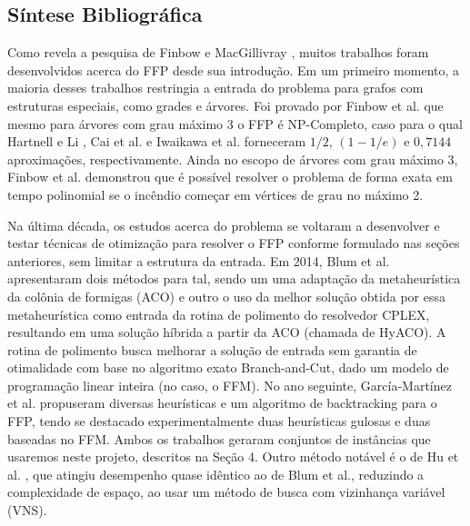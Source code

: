 \documentclass{MO824}
\begin{document}
\subsection{Síntese Bibliográfica} \label{related}

    Como revela a pesquisa de Finbow e MacGillivray \cite{survey}, muitos trabalhos foram desenvolvidos acerca do FFP desde sua introdução. Em um primeiro momento, a maioria desses trabalhos restringia a entrada do problema para grafos com estruturas especiais, como grades e árvores. Foi provado por Finbow et al. \cite{FINBOW20072094} que mesmo para árvores com grau máximo 3 o FFP é NP-Completo, caso para o qual Hartnell e Li \cite{aprox1}, Cai et al. \cite{aprox2} e Iwaikawa et al. \cite{iwaikawa} forneceram $1/2$, $(1- 1/e)$ e $0,7144$ aproximações, respectivamente. Ainda no escopo de árvores com grau máximo 3, Finbow et al. \cite{FINBOW20072094} demonstrou que é possível resolver o problema de forma exata em tempo polinomial se o incêndio começar em vértices de grau no máximo 2.
   
    Na última década, os estudos acerca do problema se voltaram a desenvolver e testar técnicas de otimização para resolver o FFP conforme formulado nas seções anteriores, sem limitar a estrutura da entrada. Em 2014, Blum et al. \cite{blum} apresentaram dois métodos para tal, sendo um uma adaptação da metaheurística da colônia de formigas (ACO) e outro o uso da melhor solução obtida por essa metaheurística como entrada da rotina de polimento do resolvedor CPLEX, resultando em uma solução híbrida a partir da ACO (chamada de HyACO). A rotina de polimento busca melhorar a solução de entrada sem garantia de otimalidade com base no algoritmo exato Branch-and-Cut, dado um modelo de programação linear inteira (no caso, o FFM). No ano seguinte, García‐Martínez et al. \cite{garcia} propuseram diversas heurísticas e um algoritmo de backtracking para o FFP, tendo se destacado experimentalmente duas heurísticas gulosas e duas baseadas no FFM. Ambos os trabalhos geraram conjuntos de instâncias que usaremos neste projeto, descritos na Seção 4. Outro método notável é o de Hu et al. \cite{hu}, que atingiu desempenho quase idêntico ao de Blum et al., reduzindo a complexidade de espaço, ao usar um método de busca com vizinhança variável (VNS).
   
\end{document}
